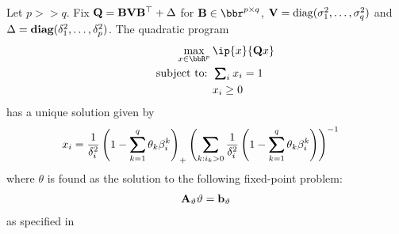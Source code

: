 \documentclass[12pt,leqno,letterpaper]{article}
\begin{document}
\vspace{-0.16in}
\begin{theorem}
Let $p >>q$.
Fix $\mathbf{Q} = \mathbf{B} \mathbf{V} \mathbf{B}^\top + \Delta$
for $\Bm \in \bbr^{p\times q}$, $\mathbf{V} = \mathrm{diag}(\sigma_1^2, \ldots, \sigma_q^2)$ and $\Delta= \textbf{diag}(\delta_1^2,\ldots,\delta_p^2)$.  The quadratic program
\begin{align}
\begin{aligned}
 \hspace{0.5in}\max_{x \in \bbR^p} \ptt
  &\ip{x}{\bQ x} \\
 \text{subject to: }
	 &\textstyle\sum\nolimits_i \hpt x_i =1  \\
	 & x_i \geq 0
\label{con}
\end{aligned}
\end{align}
has a unique solution given by
\begin{align}
x_i&=\frac{1}{\gd_i^2}\paren{1 - \sum_{k=1}^q \theta_k \gb_i^k}_+ \paren{ \sum_{k:i_k>0} \frac{1}{\gd_i^2}\paren{1 - \sum_{k=1}^q \theta_k \gb_i^k}}^{-1}
\end{align}
where $\theta$ is found as the solution to the following fixed-point problem:
\begin{align}
\mathbf{A}_\vartheta \vartheta = \mathbf{b}_\vartheta
\end{align}
as specified in 
\end{theorem}
\end{document}
